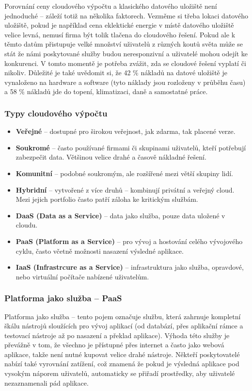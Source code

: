 \par Porovnání ceny cloudového výpočtu a klasického datového uložiště není jednoduché -- záleží totiž na několika faktorech. Vezměme si třeba lokaci datového uložiště, pokud je například cena eklektické energie v místě datového uložiště velice levná, nemusí firma být tolik tlačena do cloudového řešení. Pokud ale k těmto datům přistupuje velké množství uživatelů z různých koutů světa může se stát že námi poskytované služby budou neresponzivní a uživatelé mohou odejít ke konkurenci. V tomto momentě je potřeba zvážit, zda se cloudové řešení vyplatí či nikoliv. Důležité je také uvědomit si, že 42 \% nákladů na datové uložiště je vynaloženo na hardware a software (tyto náklady jsou rozloženy v průběhu času) a 58 \% nákladů jde do topení, klimatizaci, daně a samostatné práce. \cite{cloud-computing-dummies}

\subsubsection{Typy cloudového výpočtu}
\begin{itemize}
\item \textbf{Veřejné} -- dostupné pro širokou veřejnost, jak zdarma, tak placené verze.
\item \textbf{Soukromé} -- často používané firmami či skupinami uživatelů, kteří potřebují zabezpečit data. Většinou velice drahé a časově nákladné řešení.
\item \textbf{Komunitní} -- podobné soukromým, ale rozšířené mezi větší skupiny lidí.
\item \textbf{Hybridní} -- vytvořené z více druhů -- kombinují privátní a veřejný cloud. Mezi jejich portfolio často patří záloha ke kritickým službám.
\item \textbf{DaaS (Data as a Service)} -- data jako služba, pouze data uložené v cloudu.
\item \textbf{PaaS (Platform as a Service)} -- pro vývoj a hostování celého vývojového cyklu, často včetně možnosti nasazení výsledné aplikace.
\item \textbf{IaaS (Infrastrcure as a Service)} -- infrastruktura jako služba, opravdové, nebo virtuální počítače nabízené uživatelům. \cite{cloud-computing} \label{IaaS}
\end{itemize}

\subsubsection{Platforma jako služba -- PaaS}
Platforma jako služba -- tento pojem označuje službu, která zahrnuje kompletní škálu nástrojů sloužících pro vývoj aplikací (od databází, přes aplikační rámce a testovací nástroje až po nasazení a překlad aplikace). Výhoda této služby je převážně v tom, že všechno je přístupné přes internet a často jako webová aplikace, takže není nutné kupovat velice drahé nástroje. Někteří poskytovatelé nabízí také vyrovnání zatížení, což znamená že pokud je výsledná aplikace pod vysokým náporem uživatelů, automaticky se přiřadí prostředky, aby uživatelé nezaznamenali pád aplikace. \cite{essentials-cloud}

